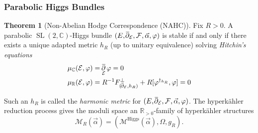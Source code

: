 \documentclass[aspectratio=1610,10pt]{beamer}
\theoremstyle{definition}
\newtheorem{theorem}[definition]{Theorem}
\theoremstyle{named}
\renewcommand{\bar}[1]{\overline{\hspace{-1pt}{#1}\hspace{-.2pt}}}
\newcommand{\R}{\mathbb{R}}
\newcommand{\C}{\mathbb{C}}
\DeclareMathOperator{\delbar}{\bar\partial}
\DeclareMathOperator{\SL}{SL}
\begin{document}
\begin{frame}
    \frametitle{Parabolic Higgs Bundles}
    \begin{theorem}[Non-Abelian Hodge Correspondence (NAHC)]
        Fix $R>0$.  A parabolic $\SL(2,\C)$-Higgs bundle $(E,\delbar_\mathcal E,\mathcal F,\vec\alpha,\varphi)$ is stable if and only if there exists a unique adapted metric $h_R$ (up to unitary equivalence) solving \emph{Hitchin's equations}
            \begin{align*}
                \mu_\C(\mathcal E,\varphi)&=\delbar_\mathcal E\varphi=0\\
                \mu_\R(\mathcal E,\varphi)&=R^{-1}F_{(\delbar_\mathcal E,h_R)}^\perp+R[\varphi^{\dagger_{h_R}},\varphi]=0
            \end{align*}
    \end{theorem}
    Such an $h_R$ is called the \emph{harmonic metric} for $(E,\delbar_\mathcal E,\mathcal F,\vec\alpha,\varphi)$.
    \vfill
    \pause
    The hyperkähler reduction process gives the moduli space an $\R_{>0}$-family of hyperkähler structures
        $$\mathcal M_R(\vec\alpha)=(\mathcal M^\text{Higgs}(\vec\alpha),\Omega,g_R).$$
    \vfill
\end{frame}
\end{document}
